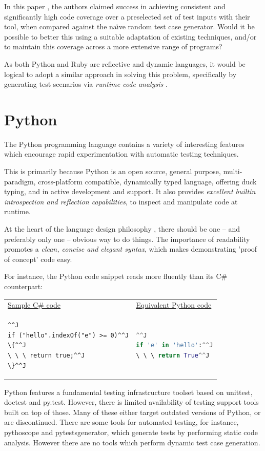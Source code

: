 \documentclass{icldt}
\numberwithin{equation}{section}       %
\def\naive{na\"{\i}ve }
\begin{document}
In this paper \cite{Mairhofer2011}, the authors claimed success in achieving consistent and significantly high code coverage over a preselected set of test inputs with their tool, when compared against the \naive random test case generator. Would it be possible to better this using a suitable adaptation of existing techniques, and/or to maintain this coverage across a more extensive range of programs?

As both Python and Ruby are reflective and dynamic languages, it would be logical to adopt a similar approach in solving this problem, specifically by generating test scenarios via \emph{runtime code analysis} \cite{Mairhofer2011}.
\section{Python}
The Python programming language contains a variety of interesting features which encourage rapid experimentation with automatic testing techniques.

This is primarily because Python is an open source, general purpose, multi-paradigm, cross-platform compatible, dynamically typed language, offering duck typing, and in active development and support. It also provides \emph{excellent builtin introspection and reflection capabilities}, to inspect and manipulate code at runtime.

At the heart of the language design philosophy \cite{Pep20ZenPython}, there should be one -- and preferably only one -- obvious way to do things. The importance of readability promotes a \emph{clean, concise and elegant syntax}, which makes demonstrating 'proof of concept' code easy.

For instance, the Python code snippet reads more fluently than its C\# counterpart:

\begin{tabularx}{\textwidth}{X X}
\underline{Sample C\# code} & \underline{Equivalent Python code} \\
\begin{lstlisting}[language=CSharp]^^J
if ("hello".indexOf("e") >= 0)^^J
\{^^J
\ \ \ return true;^^J
\}^^J
\end{lstlisting}
&
\begin{lstlisting}[language=python]^^J
if 'e' in 'hello':^^J
\ \ \ return True^^J
\end{lstlisting}
\end{tabularx}
Python features a fundamental testing infrastructure toolset based on \textsf{unittest}, \textsf{doctest} and \textsf{py.test}. However, there is limited availability of testing support tools built on top of those. Many of these either target outdated versions of Python, or are discontinued. There are some tools for automated testing, for instance, \textsf{pythoscope} and \textsf{pytestsgenerator}, which generate tests by performing static code analysis. However there are no tools which perform dynamic test case generation.
\end{document}
